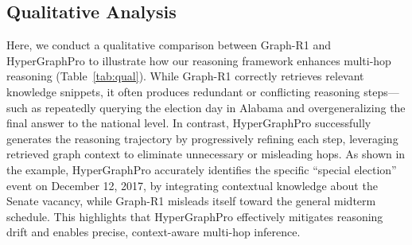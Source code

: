 \subsection{Qualitative Analysis}
Here, we conduct a qualitative comparison between Graph-R1 and HyperGraphPro to illustrate how our reasoning framework enhances multi-hop reasoning (Table~\ref{tab:qual}).
While Graph-R1 correctly retrieves relevant knowledge snippets, it often produces redundant or conflicting reasoning steps—such as repeatedly querying the election day in Alabama and overgeneralizing the final answer to the national level.
In contrast, HyperGraphPro successfully generates the reasoning trajectory by progressively refining each step, leveraging retrieved graph context to eliminate unnecessary or misleading hops.
As shown in the example, HyperGraphPro accurately identifies the specific “special election” event on December 12, 2017, by integrating contextual knowledge about the Senate vacancy, while Graph-R1 misleads itself toward the general midterm schedule.
This highlights that HyperGraphPro effectively mitigates reasoning drift and enables precise, context-aware multi-hop inference.